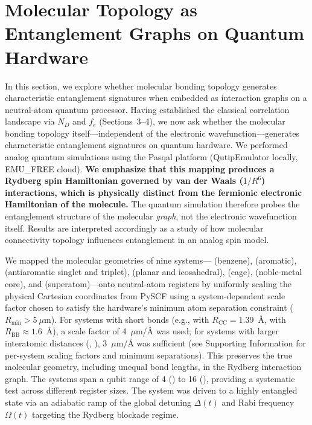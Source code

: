 \documentclass[12pt,a4paper]{article}
\begin{document}
\section{Molecular Topology as Entanglement Graphs on Quantum Hardware}
\label{sec:quantum}

In this section, we explore whether molecular bonding topology generates
characteristic entanglement signatures when embedded as interaction graphs
on a neutral-atom quantum processor. Having established the classical
correlation landscape via $N_D$ and $f_e$ (Sections~3--4), we now ask
whether the molecular bonding topology itself---independent of the
electronic wavefunction---generates characteristic entanglement signatures
on quantum hardware. We performed analog quantum
simulations using the Pasqal platform (QutipEmulator locally, EMU\_FREE
cloud). \textbf{We emphasize that this mapping produces a Rydberg spin
Hamiltonian governed by van der Waals ($1/R^6$) interactions, which is
physically distinct from the fermionic electronic Hamiltonian of the
molecule.} The quantum simulation therefore probes the entanglement
structure of the molecular \emph{graph}, not the electronic wavefunction
itself. Results are interpreted accordingly as a study of how molecular
connectivity topology influences entanglement in an analog spin model.

We mapped the molecular geometries of nine systems--- (benzene),
 (aromatic),  (antiaromatic singlet and triplet),
 (planar and icosahedral),  (cage),  (noble-metal
core), and  (superatom)---onto neutral-atom registers by
uniformly scaling the physical Cartesian coordinates from PySCF
using a system-dependent scale factor chosen to satisfy the hardware's minimum atom
separation constraint ($R_{\text{min}} > 5~\mu$m).
For systems with short bonds (e.g.,  with $R_{\text{CC}} = 1.39$~\AA,
 with $R_{\text{BB}} \approx 1.6$~\AA), a scale factor of 4~$\mu$m/\AA{}
was used; for systems with larger interatomic distances (, ),
3~$\mu$m/\AA{} was sufficient (see Supporting Information for per-system
scaling factors and minimum separations).
This preserves the true molecular geometry, including unequal bond
lengths, in the Rydberg interaction graph.
The systems span a qubit range of 4 () to 16 (),
providing a systematic test across different register sizes.
The system was driven to a highly entangled state via an adiabatic ramp of the
global detuning $\Delta(t)$ and Rabi frequency $\Omega(t)$ targeting the
Rydberg blockade regime.
\end{document}
